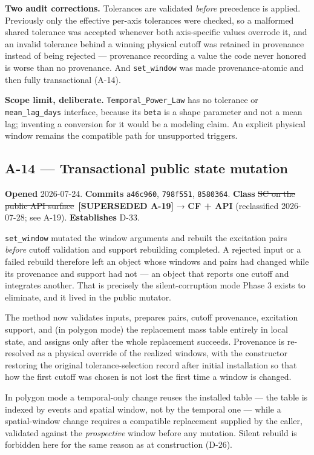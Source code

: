 \documentclass[
  10pt,
]{article}
\newcommand{\amdstrike}[1]{\sout{#1}}
\newcommand{\amdstrike}[1]{\textcolor{supcolor}{#1}}
\newcommand{\supsd}[2]{{\color{supcolor}\amdstrike{#2}}~{\color{amdcolor}\footnotesize\textbf{[SUPERSEDED #1]}}}
\begin{document}
\textbf{Two audit corrections.} Tolerances are validated \emph{before} precedence is applied. Previously only the effective per-axis tolerances were checked, so a malformed shared tolerance was accepted whenever both axis-specific values overrode it, and an invalid tolerance behind a winning physical cutoff was retained in provenance instead of being rejected --- provenance recording a value the code never honored is worse than no provenance. And \texttt{set\_window} was made provenance-atomic and then fully transactional (A-14).

\textbf{Scope limit, deliberate.} \texttt{Temporal\_Power\_Law} has no tolerance or \texttt{mean\_lag\_days} interface, because its \texttt{beta} is a shape parameter and not a mean lag; inventing a conversion for it would be a modeling claim. An explicit physical window remains the compatible path for unsupported triggers.

\hypertarget{a-14}{%
\subsection{A-14 --- Transactional public state mutation}\label{a-14}}

\textbf{Opened} 2026-07-24. \textbf{Commits} \texttt{a46c960}, \texttt{798f551}, \texttt{8580364}. \textbf{Class} \supsd{A-19}{SC on the public API surface} → \textbf{CF + API} (reclassified 2026-07-28; see A-19). \textbf{Establishes} D-33.

\texttt{set\_window} mutated the window arguments and rebuilt the excitation pairs \emph{before} cutoff validation and support rebuilding completed. A rejected input or a failed rebuild therefore left an object whose windows and pairs had changed while its provenance and support had not --- an object that reports one cutoff and integrates another. That is precisely the silent-corruption mode Phase 3 exists to eliminate, and it lived in the public mutator.

The method now validates inputs, prepares pairs, cutoff provenance, excitation support, and (in polygon mode) the replacement mass table entirely in local state, and assigns only after the whole replacement succeeds. Provenance is re-resolved as a physical override of the realized windows, with the constructor restoring the original tolerance-selection record after initial installation so that how the first cutoff was chosen is not lost the first time a window is changed.

In polygon mode a temporal-only change reuses the installed table --- the table is indexed by events and spatial window, not by the temporal one --- while a spatial-window change requires a compatible replacement supplied by the caller, validated against the \emph{prospective} window before any mutation. Silent rebuild is forbidden here for the same reason as at construction (D-26).
\end{document}
